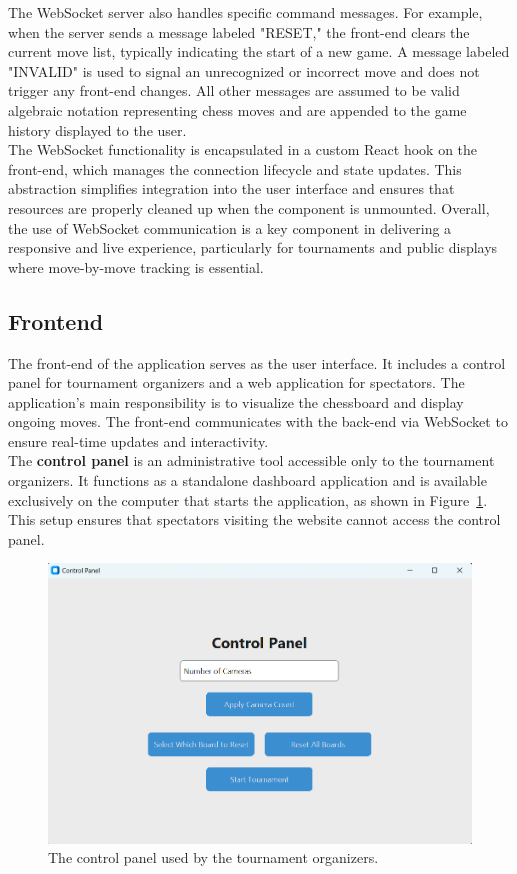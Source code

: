 The WebSocket server also handles specific command messages. For example, when the server sends a message labeled "RESET," the front-end clears the current move list, typically indicating the start of a new game. A message labeled "INVALID" is used to signal an unrecognized or incorrect move and does not trigger any front-end changes. All other messages are assumed to be valid algebraic notation representing chess moves and are appended to the game history displayed to the user. \\

The WebSocket functionality is encapsulated in a custom React hook on the front-end, which manages the connection lifecycle and state updates. This abstraction simplifies integration into the user interface and ensures that resources are properly cleaned up when the component is unmounted. Overall, the use of WebSocket communication is a key component in delivering a responsive and live experience, particularly for tournaments and public displays where move-by-move tracking is essential.

\subsection{Frontend}
The front-end of the application serves as the user interface. It includes a control panel for tournament organizers and a web application for spectators. The application's main responsibility is to visualize the chessboard and display ongoing moves. The front-end communicates with the back-end via WebSocket to ensure real-time updates and interactivity. \\

The \textbf{control panel} is an administrative tool accessible only to the tournament organizers. It functions as a standalone dashboard application and is available exclusively on the computer that starts the application, as shown in Figure~\ref{fig:control-panel}. This setup ensures that spectators visiting the website cannot access the control panel. \\

\begin{figure}[h!] \centering \includegraphics[width=0.75\linewidth]{figures/results/frontend/control-panel/control-panel.png} \caption[Control panel for tournament organizers]{The control panel used by the tournament organizers.}\label{fig:control-panel} \end{figure}

